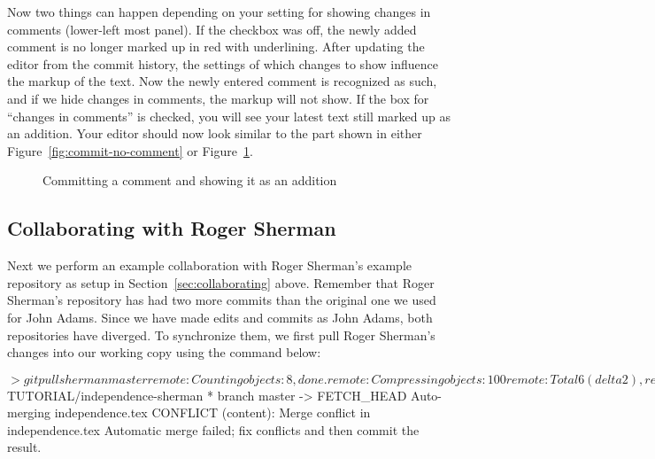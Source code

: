 Now two things can happen depending on your setting for showing changes in comments (lower-left most panel).  If the checkbox was off, the newly added comment is no longer marked up in red with underlining.  After updating the editor from the commit history, the settings of which changes to show influence the markup of the text.  Now the newly entered comment is recognized as such, and if we hide changes in comments, the markup will not show.  If the box for ``changes in comments'' is checked, you will see your latest text still marked up as an addition.  Your editor should now look similar to the part shown in either Figure~\ref{fig:commit-no-comment} or Figure~\ref{fig:commit-comment}.
\begin{figure}
\centering
  \begin{minipage}[t]{0.48\linewidth}
  \centering
  \caption{Committing a comment but not showing it as an addition} \label{fig:commit-no-comment}
  \end{minipage}%
\hspace{0.04\linewidth}%
  \begin{minipage}[t]{0.48\linewidth}
  \centering
  \caption{Committing a comment and showing it as an addition} \label{fig:commit-comment}
  \end{minipage}  
\end{figure}

\subsection{Collaborating with Roger Sherman} \label{sec:tutorial-git:collab}

Next we perform an example collaboration with Roger Sherman's example repository as setup in Section~\ref{sec:collaborating} above. Remember that Roger Sherman's repository has had two more commits than the original one we used for John Adams.  Since we have made edits and commits as John Adams, both repositories have diverged.  To synchronize them, we first pull Roger Sherman's changes into our working copy using the  command below:

\begin{CodeVerbatim}
$> git pull sherman master
remote: Counting objects: 8, done.
remote: Compressing objects: 100%
remote: Total 6 (delta 2), reused 5 (delta 1)
Unpacking objects: 100%
From $TUTORIAL/independence-sherman
 * branch            master     -> FETCH_HEAD
Auto-merging independence.tex
CONFLICT (content): Merge conflict in independence.tex
Automatic merge failed; fix conflicts and then commit the result.
\end{CodeVerbatim}

